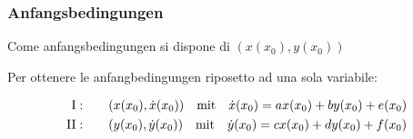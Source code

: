 \subsubsection{Anfangsbedingungen}

Come anfangsbedingungen si dispone di $(x(x_0), y(x_0))$

Per ottenere le anfangbedingungen riposetto ad una sola variabile:\vspace{-1em}

\begin{align*}
    \text{\RomanNumeralCaps{1}}: \qquad & (x(x_0), \dot{x}(x_0)) \quad \text{mit} \quad \dot{x}(x_0) = ax(x_0) + by(x_0) + e(x_0)\\
    \text{\RomanNumeralCaps{2}}: \qquad & (y(x_0), \dot{y}(x_0)) \quad \text{mit} \quad \dot{y}(x_0) = cx(x_0) + dy(x_0) + f(x_0)\\
\end{align*}\vspace{-3em}